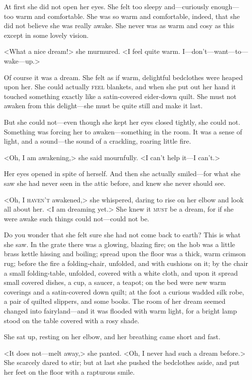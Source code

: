 At first she did not open her eyes. She felt too sleepy and—curiously enough—too warm and comfortable. She was so warm and comfortable, indeed, that she did not believe she was really awake. She never was as warm and cosy as this except in some lovely vision.

<What a nice dream!> she murmured. <I feel quite warm. I—don't—want—to—wake—up.>

Of course it was a dream. She felt as if warm, delightful bedclothes were heaped upon her. She could actually \textsc{feel} blankets, and when she put out her hand it touched something exactly like a satin-covered eider-down quilt. She must not awaken from this delight—she must be quite still and make it last.

But she could not—even though she kept her eyes closed tightly, she could not. Something was forcing her to awaken—something in the room. It was a sense of light, and a sound—the sound of a crackling, roaring little fire.

<Oh, I am awakening,> she said mournfully. <I can't help it—I can't.>

Her eyes opened in spite of herself. And then she actually smiled—for what she saw she had never seen in the attic before, and knew she never should see.

<Oh, I \textsc{haven't} awakened,> she whispered, daring to rise on her elbow and look all about her. <I am dreaming yet.> She knew it \textsc{must} be a dream, for if she were awake such things could not—could not be.

Do you wonder that she felt sure she had not come back to earth? This is what she saw. In the grate there was a glowing, blazing fire; on the hob was a little brass kettle hissing and boiling; spread upon the floor was a thick, warm crimson rug; before the fire a folding-chair, unfolded, and with cushions on it; by the chair a small folding-table, unfolded, covered with a white cloth, and upon it spread small covered dishes, a cup, a saucer, a teapot; on the bed were new warm coverings and a satin-covered down quilt; at the foot a curious wadded silk robe, a pair of quilted slippers, and some books. The room of her dream seemed changed into fairyland—and it was flooded with warm light, for a bright lamp stood on the table covered with a rosy shade.

She sat up, resting on her elbow, and her breathing came short and fast.

<It does not—melt away,> she panted. <Oh, I never had such a dream before.> She scarcely dared to stir; but at last she pushed the bedclothes aside, and put her feet on the floor with a rapturous smile.

